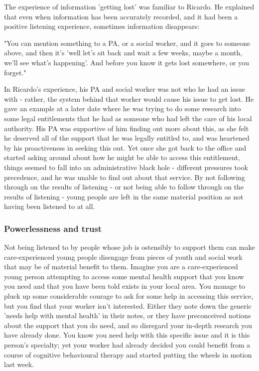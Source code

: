 The experience of information 'getting lost' was familiar to Ricardo. He explained that even when information has been accurately recorded, and it had been a positive listening experience, sometimes information disappears:

"You can mention something to a PA, or a social worker, and it goes to someone above, and then it's 'well let's sit back and wait a few weeks, maybe a month, we'll see what's happening'. And before you know it gets lost somewhere, or you forget."

In Ricardo's experience, his PA and social worker was not who he had an issue with - rather, the system behind that worker would cause his issue to get lost. He gave an example at a later date where he was trying to do some research into some legal entitlements that he had as someone who had left the care of his local authority. His PA was supportive of him finding out more about this, as she felt he deserved all of the support that he was legally entitled to, and was heartened by his proactiveness in seeking this out. Yet once she got back to the office and started asking around about how he might be able to access this entitlement, things seemed to fall into an administrative black hole - different pressures took precedence, and he was unable to find out about that service. By not following through on the results of listening - or not being able to follow through on the results of listening - young people are left in the same material position as not having been listened to at all.

\subsubsection{Powerlessness and trust}
Not being listened to by people whose job is ostensibly to support them can make care-experienced young people disengage from pieces of youth and social work that may be of material benefit to them. Imagine you are a care-experienced young person attempting to access some mental health support that you know you need and that you have been told exists in your local area. You manage to pluck up some considerable courage to ask for some help in accessing this service, but you find that your worker isn't interested. Either they note down the generic 'needs help with mental health' in their notes, or they have preconceived notions about the support that you do need, and so disregard your in-depth research you have already done. You know you need help with this specific issue and it is this person's specialty; yet your worker had already decided you could benefit from a course of cognitive behavioural therapy and started putting the wheels in motion last week.

